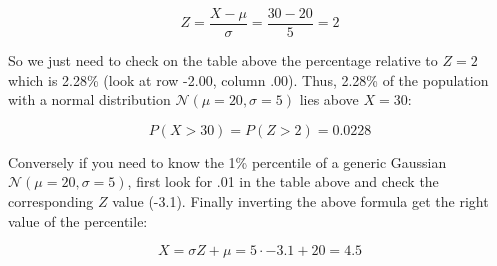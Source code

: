 \[Z=\frac{X-\mu}{\sigma} = \frac{30-20}{5}=2\]

So we just need to check on the table above the percentage relative to \(Z=2\) which is 2.28\% (look at row -2.00, column .00). Thus, 2.28\% of the population with a normal distribution \(\mathcal{N}(\mu=20 ,\sigma=5)\) lies above \(X=30\):

\[P(X>30)=P(Z>2)=0.0228\]

Conversely if you need to know the 1\% percentile of a generic Gaussian \(\mathcal{N}(\mu=20 ,\sigma=5)\), first look for .01 in the table above and check the corresponding \(Z\) value (-3.1). Finally inverting the above formula get the right value of the percentile:

\[ X= \sigma Z + \mu = 5\cdot -3.1 + 20 = 4.5 \]
